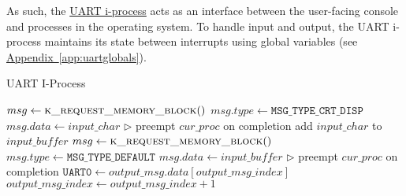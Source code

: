 \documentclass[12pt]{report}
\begin{document}
As such, the \hyperref[alg:uartiprocess]{UART i-process} acts as an interface between the user-facing console and processes in the operating system. To handle input and output, the UART i-process maintains its state between interrupts using global variables (see \hyperref[app:uartglobals]{Appendix~\ref*{app:uartglobals}}).

\begin{algorithm}
\caption{UART I-Process}
\label{alg:uartiprocess}
\begin{algorithmic}[1]
         
            \State $msg \leftarrow \Call{k\_request\_memory\_block}{\null}$
            \State $msg.type \leftarrow \texttt{MSG_TYPE_CRT_DISP}$
            \State $msg.data \leftarrow input\_char$
            \State {}
            \State $\triangleright$ preempt $cur\_proc$ on completion
        \EndIf
                \State add $input\_char$ to $\mathit{input\_buffer}$
            \Else
                \State $msg \leftarrow \Call{k\_request\_memory\_block}{\null}$
                \State $msg.type \leftarrow \texttt{MSG_TYPE_DEFAULT}$
                \State $msg.data \leftarrow \mathit{input\_buffer}$
                \State {} 
                \State $\triangleright$ preempt $cur\_proc$ on completion
            \EndIf
        \State $\texttt{UART0} \leftarrow output\_msg.data[output\_msg\_index]$
        \State $output\_msg\_index \leftarrow output\_msg\_index + 1$
    \EndIf
\EndProcedure
\end{algorithmic}
\end{algorithm}
\end{document}
